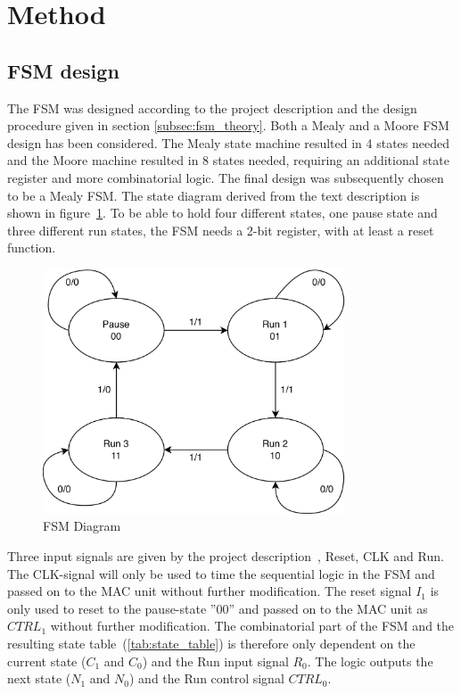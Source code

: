 \section{Method}
\label{sec:method}

\subsection{FSM design}

The FSM was designed according to the project description and the design procedure given in section \ref{subsec:fsm_theory}. Both a Mealy and a Moore FSM design has been considered. The Mealy state machine resulted in 4 states needed and the Moore machine resulted in 8 states needed, requiring an additional state register and more combinatorial logic. The final design was subsequently chosen to be a Mealy FSM. The state diagram derived from the text description is shown in figure~\ref{fig:fsm_diagram}. To be able to hold four different states, one pause state and three different run states, the FSM needs a 2-bit register, with at least a reset function. 

\begin{figure}[H]
    \centering
    \includegraphics[width=0.8\textwidth]{Figures/FSM-diagram.png}
    \caption{FSM Diagram}
    \label{fig:fsm_diagram}
\end{figure}

Three input signals are given by the project description~\cite{project_description}, Reset, CLK and Run. The CLK-signal
will only be used to time the sequential logic in the FSM and passed on to the MAC unit without
further modification. The reset signal $I_1$ is only used to reset to the pause-state ''00'' and passed on to the MAC unit as $CTRL_1$ without further modification. The combinatorial part of the FSM and the resulting state table~(\ref{tab:state_table}) is therefore only dependent on the current state ($C_1$ and $C_0$) and the Run input signal $R_0$. The logic outputs the next state ($N_1$ and $N_0$) and the Run control signal $CTRL_0$.

